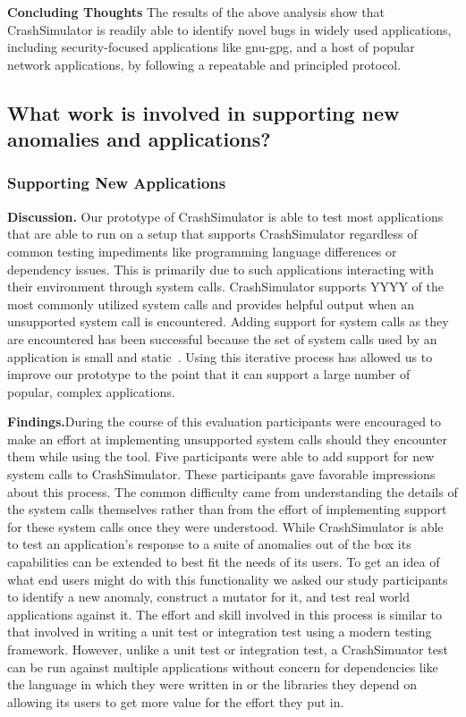 {\bf Concluding Thoughts} The results of the above analysis show that
CrashSimulator is readily able to identify novel bugs in widely used
applications, including security-focused applications like gnu-gpg, and a host
of popular network applications, by following a repeatable and principled
protocol.


\subsection{What work is involved in supporting new anomalies and
applications?}
\label{sec-new-anom-app}


\subsubsection{Supporting New Applications}
{\bf Discussion.} Our prototype of CrashSimulator is able to test most
applications that are able to run on a setup that supports CrashSimulator
regardless of common testing impediments like programming language
differences or dependency issues.  This is primarily due to such
applications interacting with their environment through system calls.
CrashSimulator supports YYYY of the most commonly utilized system calls and
provides helpful output when an unsupported system call is encountered.
Adding support for system calls as they are encountered has been successful
because the set of system calls used by an application is small and
static~\cite{Tsai:2016:SML:2901318.2901341}.  Using this iterative process
has allowed us to improve our prototype to the point that it can support a
large number of popular, complex applications.

{\bf Findings.}During the
course of this evaluation participants were encouraged to make
an effort at implementing unsupported system calls should they encounter
them while using the tool.  Five participants were able to add support for
new system calls to CrashSimulator.  These participants gave favorable
impressions about this process.  The common difficulty came from
understanding the details of the system calls themselves rather than from
the effort of implementing support for these system calls once they were
understood.
While CrashSimulator is able to test an application's response to a suite
of anomalies out of the box its capabilities can be extended to best fit
the needs of its users.  To get an idea of what end users might do with
this functionality we asked our study participants to identify a new
anomaly, construct a mutator for it, and test real world applications
against it.
The effort and skill involved in
this process is similar to that involved in writing a unit test or
integration test using a modern testing framework.  However, unlike a unit
test or integration test, a CrashSimuator test can be run
against multiple
applications without concern for dependencies like the language in which
they were
written in or the libraries they depend on allowing its users to get more
value for the effort they put in.


